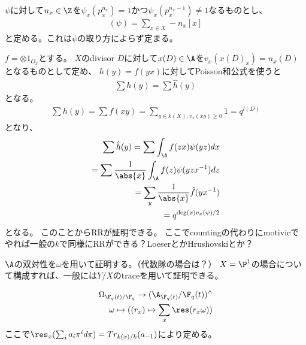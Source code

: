 \documentclass{jsarticle}
\begin{document}
$\psi$に対して$n_x\in\Z$を$\psi_x(p_x^{n_x})=1$かつ$\psi_x(p_x^{n_x-1})\neq1$なるものとし、
\begin{align*}
(\psi)=\sum_{x\in X}-n_x[x]
\end{align*}
と定める。これは$\psi$の取り方によらず定まる。

$f=\otimes 1_{O_x}$とする。
$X$のdivisor $D$に対して$x(D)\in\A$を$v_x(x(D)_x)=n_x(D)$となるものとして定め、
$h(y)=f(yx)$に対してPoisson和公式を使うと
\begin{align*}
\sum h(y)=\sum\hat{h}(y)
\end{align*}
となる。
\begin{align*}
\sum h(y)=\sum f(xy)=\sum_{y\in k(X), v_x(xy)\geq0} 1=q^{l(D)}
\end{align*}
となり、
\begin{align*}
\sum\hat{h}(y)=\sum\int_{\A}f(zx)\psi(yz)dx\\
=\sum\frac{1}{\abs{x}}\int_{\A}f(z)\psi(yzx^{-1})dz\\
=\sum_y\frac{1}{\abs{x}}\hat{f}(yx^{-1})\\
=q^{\deg(x)v_x(\psi)/2}
\end{align*}
となる。
このことからRRが証明できる。
ここでcountingの代わりにmotivicでやれば一般の$k$で同様にRRができる？LoeserとかHrushovskiとか？

$\A$の双対性を$\omega$を用いて証明する。（代数隊の場合は？）
$X=\P^1$の場合について構成すれば、一般には$Y/X$のtraceを用いて証明できる。

\begin{align*}
\Omega_{\F_q(t)/\F_q}\to(\A_{\F_q(t)}/\F_q(t))^{\wedge}\\
\omega\mapsto((r_x)\mapsto\sum_x\res(r_x\omega))
\end{align*}
ここで$\res_x(\sum_ia_i\pi^id\pi)=Tr_{k(x)/k}(a_{-1})$により定める。
\end{document}
